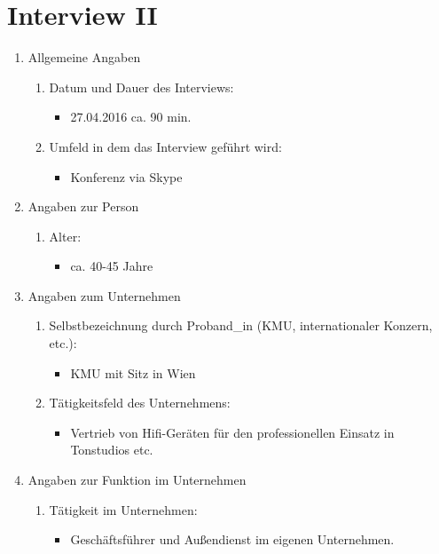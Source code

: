 \documentclass[Bachelorarbeit.tex]{subfiles}
\begin{document}
\section{Interview II}
\begin{enumerate}
	\item Allgemeine Angaben
	\begin{enumerate}
		\item Datum und Dauer des Interviews:
		\begin{itemize}
			\item[] 27.04.2016 ca. 90 min.
		\end{itemize}
		\item Umfeld in dem das Interview geführt wird:
		\begin{itemize}
			\item[] Konferenz via Skype
		\end{itemize}
	\end{enumerate}
	\item Angaben zur Person
	\begin{enumerate}
		\item Alter: 
		\begin{itemize}
			\item[] ca. 40-45 Jahre
		\end{itemize}
	\end{enumerate}
	\item Angaben zum Unternehmen
	\begin{enumerate}
		\item Selbstbezeichnung durch Proband\_in  (\ac{KMU}, internationaler Konzern, etc.):
		\begin{itemize}
			\item[] \ac{KMU} mit Sitz in Wien
		\end{itemize}
		\item Tätigkeitsfeld des Unternehmens:
		\begin{itemize}
			\item[] Vertrieb von Hifi-Geräten für den professionellen Einsatz in Tonstudios etc. 
		\end{itemize}
	\end{enumerate}
	\item Angaben zur Funktion im Unternehmen
	\begin{enumerate}
		\item Tätigkeit im Unternehmen:
		\begin{itemize}
			\item[] Geschäftsführer und Außendienst im eigenen Unternehmen.
		\end{itemize}

\end{enumerate}
\end{enumerate}
\end{document}

